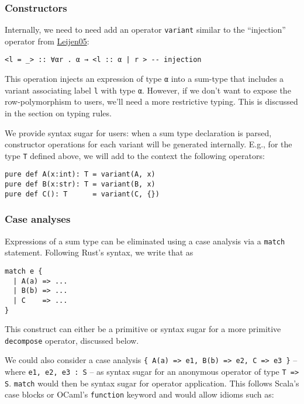 \documentclass[11pt]{article}
\begin{document}
\subsubsection{Constructors}
\label{sec:orgc7e9737}

Internally, we need to need add an operator \texttt{variant} similar to the ``injection''
operator from \href{https://www.microsoft.com/en-us/research/publication/extensible-records-with-scoped-labels/}{Leijen05}:

\begin{verbatim}
<l = _> :: ∀αr . α → <l :: α | r > -- injection
\end{verbatim}


This operation injects an expression of type \texttt{α} into a sum-type that includes a
variant associating label \texttt{l} with type \texttt{α}.  However, if we don't want to
expose the row-polymorphism to users, we'll need a more restrictive typing. This
is discussed in the section on typing rules.

We provide syntax sugar for users: when a sum type declaration is parsed,
constructor operations for each variant will be generated internally. E.g., for
the type \texttt{T} defined above, we will add to the context the following operators:

\begin{verbatim}
pure def A(x:int): T = variant(A, x)
pure def B(x:str): T = variant(B, x)
pure def C(): T      = variant(C, {})
\end{verbatim}

\subsubsection{Case analyses}
\label{sec:orgc4b162c}
Expressions of a sum type can be eliminated using a case analysis via
a \texttt{match} statement. Following Rust's syntax, we write that as

\begin{verbatim}
match e {
  | A(a) => ...
  | B(b) => ...
  | C    => ...
}
\end{verbatim}

This construct can either be a primitive or syntax sugar for a more
primitive \texttt{decompose} operator, discussed below.

We could also consider a case analysis \texttt{\{ A(a) => e1, B(b) => e2, C => e3 \}} --
where \texttt{e1, e2, e3 : S} -- as syntax sugar for an anonymous operator of type \texttt{T
=> S}. \texttt{match} would then be syntax sugar for operator application. This follows
Scala's case blocks or OCaml's \texttt{function} keyword and would allow idioms such
as:
\end{document}
